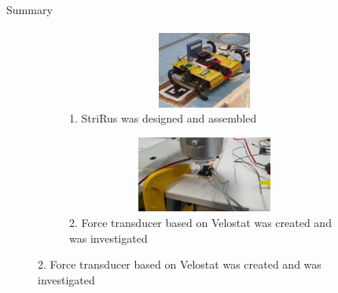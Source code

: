 \documentclass[aspectratio=169,xcolor=table]{beamer}
\begin{document}
\begin{frame}[t]{Summary}
    \framesubtitle{}
    \large
    \vspace{-0.7cm}
    \begin{figure}[H]
        \begin{subfigure}[t]{0.49\textwidth}
            \centering\includegraphics[height=2.5cm,width=1\textwidth,keepaspectratio]{strirus_3.JPG}
            \caption*{1. StriRus was designed and assembled}
        \end{subfigure}
        \begin{subfigure}[t]{0.49\textwidth}
            \centering\includegraphics[height=2.5cm,width=1\textwidth,keepaspectratio]{velostat_sensor_look.JPG}
            \caption*{2. Force transducer based on Velostat was created and was investigated}
        \end{subfigure}
    

\end{figure}
\end{frame}
\end{document}
